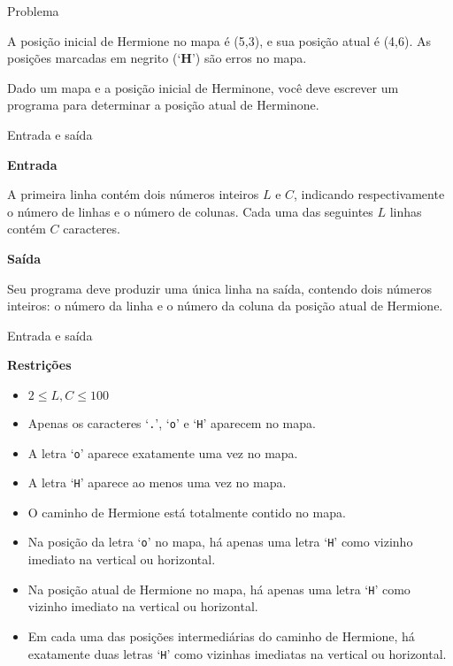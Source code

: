 \begin{frame}[fragile]{Problema}

A posição inicial de Hermione no mapa é (5,3), e sua posição atual é (4,6). As posições marcadas em
negrito (`\textbf{H}') são erros no mapa.

Dado um mapa e a posição inicial de Herminone, você deve escrever um programa para determinar a
posição atual de Herminone.

\end{frame}

\begin{frame}[fragile]{Entrada e saída}

\textbf{Entrada}

A primeira linha contém dois números inteiros $L$ e $C$, indicando respectivamente o número de
linhas e o número de colunas. Cada uma das seguintes $L$ linhas contém $C$ caracteres.

\vspace{0.1in}

\textbf{Saída}

Seu programa deve produzir uma única linha na saída, contendo dois números inteiros: o número da
linha e o número da coluna da posição atual de Hermione.

\end{frame}

\begin{frame}[fragile]{Entrada e saída}

\textbf{Restrições}

\begin{itemize}
    \item $2 \leq L, C \leq 100$
    \item Apenas os caracteres `\texttt{.}', `\texttt{o}' e `\texttt{H}' aparecem no mapa.
    \item A letra `\texttt{o}' aparece exatamente uma vez no mapa.
    \item A letra `\texttt{H}' aparece ao menos uma vez no mapa.
    \item O caminho de Hermione está totalmente contido no mapa.
    \item Na posição da letra `\texttt{o}' no mapa, há apenas uma letra `\texttt{H}' como vizinho
        imediato na vertical ou horizontal.
    \item Na posição atual de Hermione no mapa, há apenas uma letra `\texttt{H}' como vizinho
        imediato na vertical ou horizontal.
    \item Em cada uma das posições intermediárias do caminho de Hermione, há exatamente duas letras
        `\texttt{H}' como vizinhas imediatas na vertical ou horizontal. 
\end{itemize}

\end{frame}

